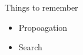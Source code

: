 \begin{frame}{Things to remember}
  \medskip
  \begin{itemize}
  \item Propoagation
  \item Search
  \end{itemize}
\end{frame}
%
